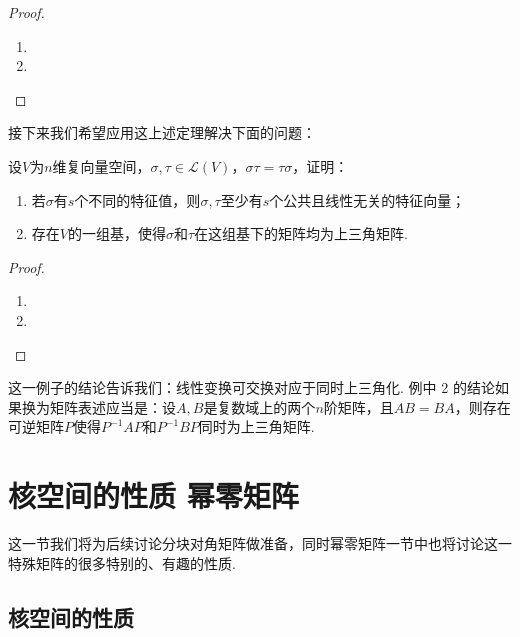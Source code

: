 \begin{proof}
    \begin{enumerate}
        \item

        \item
    \end{enumerate}
\end{proof}

接下来我们希望应用这上述定理解决下面的问题：
\begin{example}
    设$V$为$n$维复向量空间，$\sigma,\tau\in \mathcal{L}(V)$，$\sigma\tau=\tau\sigma$，证明：
    \begin{enumerate}
        \item 若$\sigma$有$s$个不同的特征值，则$\sigma,\tau$至少有$s$个公共且线性无关的特征向量；

        \item 存在$V$的一组基，使得$\sigma$和$\tau$在这组基下的矩阵均为上三角矩阵.
    \end{enumerate}
\end{example}

\begin{proof}
    \begin{enumerate}
        \item

        \item
    \end{enumerate}
\end{proof}

这一例子的结论告诉我们：线性变换可交换对应于同时上三角化. 例中 2 的结论如果换为矩阵表述应当是：设$A,B$是复数域上的两个$n$阶矩阵，且$AB=BA$，则存在可逆矩阵$P$使得$P^{-1}AP$和$P^{-1}BP$同时为上三角矩阵.

\section{核空间的性质 \quad 幂零矩阵}

这一节我们将为后续讨论分块对角矩阵做准备，同时幂零矩阵一节中也将讨论这一特殊矩阵的很多特别的、有趣的性质.

\subsection{核空间的性质}

